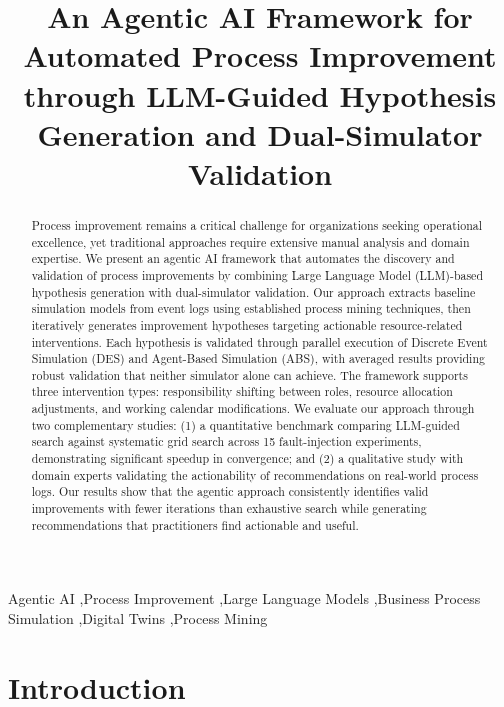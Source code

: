 \documentclass[preprint,12pt]{elsarticle}
\begin{document}
\begin{frontmatter}

\title{An Agentic AI Framework for Automated Process Improvement through LLM-Guided Hypothesis Generation and Dual-Simulator Validation}


\begin{abstract}
Process improvement remains a critical challenge for organizations seeking operational excellence, yet traditional approaches require extensive manual analysis and domain expertise. We present an agentic AI framework that automates the discovery and validation of process improvements by combining Large Language Model (LLM)-based hypothesis generation with dual-simulator validation. Our approach extracts baseline simulation models from event logs using established process mining techniques, then iteratively generates improvement hypotheses targeting actionable resource-related interventions. Each hypothesis is validated through parallel execution of Discrete Event Simulation (DES) and Agent-Based Simulation (ABS), with averaged results providing robust validation that neither simulator alone can achieve. The framework supports three intervention types: responsibility shifting between roles, resource allocation adjustments, and working calendar modifications. We evaluate our approach through two complementary studies: (1) a quantitative benchmark comparing LLM-guided search against systematic grid search across 15 fault-injection experiments, demonstrating significant speedup in convergence; and (2) a qualitative study with domain experts validating the actionability of recommendations on real-world process logs. Our results show that the agentic approach consistently identifies valid improvements with fewer iterations than exhaustive search while generating recommendations that practitioners find actionable and useful.
\end{abstract}

\begin{keyword}
Agentic AI \sep Process Improvement \sep Large Language Models \sep Business Process Simulation \sep Digital Twins \sep Process Mining
\end{keyword}

\end{frontmatter}

\section{Introduction}
\label{sec:intro}
\end{document}
